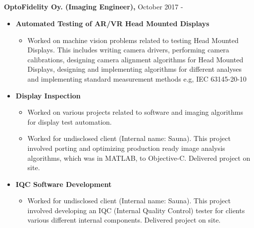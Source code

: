 \documentclass{article}
\begin{document}
\subsection{}
\textbf{OptoFidelity Oy. (Imaging Engineer),} October 2017 -
\begin{itemize}[label={}]
  \item \textbf{Automated Testing of AR/VR Head Mounted Displays}
    \begin{itemize}[label={--}]
      \item Worked on machine vision problems related to testing Head Mounted
        Displays.  This includes writing camera drivers, performing camera
        calibrations, designing camera alignment algorithms for Head Mounted
        Displays, designing and implementing algorithms for different analyses and
        implementing standard measurement methods e.g, IEC 63145-20-10
    \end{itemize}

  \item \textbf{Display Inspection}
    \begin{itemize}[label={--}]
    \item Worked on various projects related to software and imaging algorithms
      for display test automation.
    \item Worked for undisclosed client (Internal name: Sauna). This project
      involved porting and optimizing production ready image analysis algorithms,
      which was in MATLAB, to Objective-C. Delivered project on site.
    \end{itemize}

  \item \textbf{IQC Software Development}
    \begin{itemize}[label={--}]
      \item Worked for undisclosed client (Internal name: Sauna). This project
        involved developing an IQC (Internal Quality Control) tester for clients
        various different internal components.  Delivered project on site.
    \end{itemize}

\end{itemize}
\end{document}

